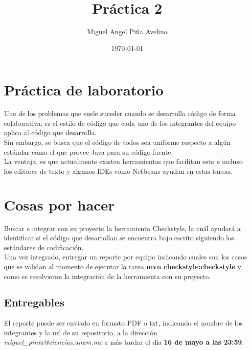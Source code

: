 \documentclass[11pt]{article}
\author{Miguel Angel Piña Avelino}
\date{\today}
\title{Práctica 2}
\begin{document}
\maketitle

\section*{Práctica de laboratorio}

Uno de los problemas que suele suceder cuando se desarrolla código de
forma colaborativa, es el estilo de código que cada uno de los
integrantes del equipo aplica al código que desarrolla.\\
\newline
Sin embargo, se busca que el código de todos sea uniforme respecto a
algún estándar como el que provee Java para su código fuente.\\
\newline
La ventaja, es que actualmente existen herramientas que facilitan
esto e incluso los editores de texto y algunos IDEs como Netbeans
ayudan en estas tareas.

\section*{Cosas por hacer}

Buscar e integrar con su proyecto la herramienta Checkstyle, la cuál
ayudará a identificar si el código que desarrollan se encuentra bajo
escrito siguiendo los estándares de codificación.\\
\newline
Una vez integrado, entregar un reporte por equipo indicando cuales son
los casos que se validan al momento de ejecutar la tarea \textbf{mvn
checkstyle:checkstyle} y como es resolvieron la integración de la
herramienta con su proyecto.


\subsection*{Entregables}

El reporte puede ser enviado en formato PDF o txt, indicando el nombre
de los integrantes y la url de su repositorio, a la dirección
\textit{miguel\_pinia@ciencias.unam.mx} a más tardar el día \textbf{16 de mayo
a las 23:59}.
\end{document}
